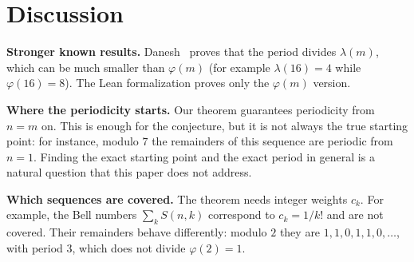\documentclass[11pt,a4paper]{article}
\theoremstyle{definition}
\theoremstyle{remark}
\newcommand{\para}[1]{\par\medskip\noindent\textbf{#1}\enspace}
\begin{document}
\section{Discussion}\label{sec:discussion}

\para{Stronger known results.} Danesh~\cite{danesh} proves that the period divides $\lambda(m)$, which can be much smaller
than $\varphi(m)$ (for example $\lambda(16)=4$ while $\varphi(16)=8$). The Lean formalization proves only the
$\varphi(m)$ version.

\para{Where the periodicity starts.} Our theorem guarantees periodicity from $n=m$ on. This is enough for the conjecture,
but it is not always the true starting point: for instance, modulo $7$ the remainders of this sequence are periodic from $n=1$. Finding the exact starting point and the
exact period in general is a natural question that this paper does not address.

\para{Which sequences are covered.} The theorem needs integer weights $c_k$. For example, the Bell numbers
$\sum_kS(n,k)$ correspond to $c_k=1/k!$ and are not covered. Their remainders behave differently: modulo $2$ they are
$1,1,0,1,1,0,\dots$, with period $3$, which does not divide $\varphi(2)=1$.
\end{document}
